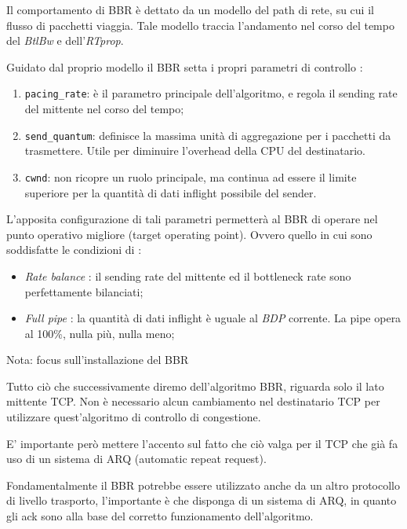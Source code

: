 Il comportamento di BBR è dettato da un modello del path di rete, su cui il flusso di pacchetti viaggia. Tale modello traccia l'andamento nel corso del tempo del \textit{BtlBw} e dell'\textit{RTprop}. \bigskip

Guidato dal proprio modello il BBR setta i propri parametri di controllo :

\begin{enumerate}

\item \texttt{pacing\_rate}: è il parametro principale dell'algoritmo, e regola il sending rate del mittente nel corso del tempo;

\item \texttt{send\_quantum}: definisce la massima unità di aggregazione per i pacchetti da trasmettere. Utile per diminuire l'overhead della CPU del destinatario.

\item \texttt{cwnd}: non ricopre un ruolo principale, ma continua ad essere il limite superiore per la quantità di dati inflight possibile del sender. 

\end{enumerate}

L'apposita configurazione di tali parametri permetterà al BBR di operare nel punto operativo migliore (target operating point). Ovvero quello in cui sono soddisfatte le condizioni di :

\begin{itemize}

\item \textit{Rate balance} : il sending rate del mittente ed il bottleneck rate sono perfettamente bilanciati;

\item \textit{Full pipe} : la quantità di dati inflight è uguale al \textit{BDP} corrente. La pipe opera al 100\%, nulla più, nulla meno;

\end{itemize}

\begin{nota}{Nota: focus sull'installazione del BBR}

Tutto ciò che successivamente diremo dell'algoritmo BBR, riguarda solo il lato mittente TCP. Non è necessario alcun cambiamento nel destinatario TCP per utilizzare quest'algoritmo di controllo di congestione. \bigskip

E' importante però mettere l'accento sul fatto che ciò valga per il TCP che già fa uso di un sistema di ARQ (automatic repeat request). \bigskip

Fondamentalmente il BBR potrebbe essere utilizzato anche da un altro protocollo di livello trasporto, l'importante è che disponga di un sistema di ARQ, in quanto gli ack sono alla base del corretto funzionamento dell'algoritmo.

\end{nota}

